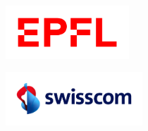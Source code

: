\documentclass[
    11pt, %
    english, %
    onehalfspacing, %
    liststotoc, %
    parskip, %
    nohyperref, %
    headsepline, %
    chapterinoneline, %
    consistentlayout, %
]{MastersDoctoralThesis} %
\author{Chia-An \textsc{YU}} %
\begin{document}
\frontmatter %

\pagestyle{plain} %


\begin{titlepage}
\begin{center}

\vspace*{-2cm}
\begin{minipage}[c]{0.4\textwidth}
    \begin{flushleft}
        \hspace*{0.4cm}
        \includegraphics[height=2.0cm]{figures/EPFL_Logo.png}
    \end{flushleft}
\end{minipage}
\hfill
\begin{minipage}[c]{0.4\textwidth}
    \begin{flushright}
        \includegraphics[height=2.0cm]{figures/Swisscom_Horizontal_RGB_Colour_Navy.png}
        \hspace*{0.4cm}
    \end{flushright}
\end{minipage}
\vfill


\HRule \\[0.4cm] %
{\huge \bfseries \ttitle\par}\vspace{0.4cm} %
\HRule \\[1.5cm] %
 

\end{center}
\end{titlepage}
\end{document}
